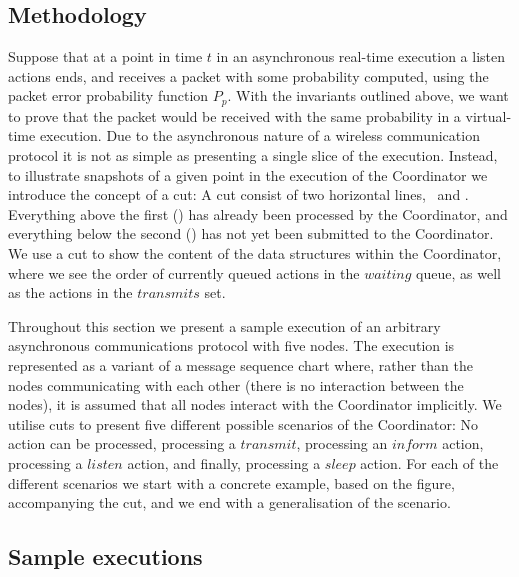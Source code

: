 \subsection{Methodology}\label{sec:correctnessmethods}
Suppose that at a point in time $t$ in an asynchronous real-time execution a listen actions ends, and receives 
a packet with some probability computed, using the packet error probability function $P_p$. With the 
invariants outlined above, we want to prove that the packet would be received with the same probability in a 
virtual-time execution. Due to the asynchronous nature of a wireless communication protocol it is not as 
simple as presenting a single slice of the execution. Instead, to illustrate snapshots of a given point in 
the execution of the Coordinator we introduce the concept of a cut: A cut consist of two horizontal lines, 
\ProcessedLine\ and \SubmittedLine. Everything above the first (\ProcessedLine) has already been processed by 
the Coordinator, and everything below the second (\SubmittedLine) has not yet been submitted to the 
Coordinator. We use a cut to show the content of the data structures within the Coordinator, where we see the 
order of currently queued actions in the $waiting$ queue, as well as the actions in the $transmits$ set. 
\medbreak

Throughout this section we present a sample execution of an arbitrary asynchronous communications protocol with five nodes. The execution is represented as a variant of a message sequence chart where, rather than the nodes communicating with each other (there is no interaction between the nodes), it is assumed that all nodes interact with the Coordinator implicitly. We utilise cuts to present five different possible scenarios of the Coordinator: No action can be processed, processing a $transmit$, processing an $inform$ action, processing a $listen$ action, and finally, processing a $sleep$ action. For each of the different scenarios we start with a concrete example, based on the figure, accompanying the cut, and we end with a generalisation of the scenario.


\subsection{Sample executions}\label{sec:coordinator-examples}

